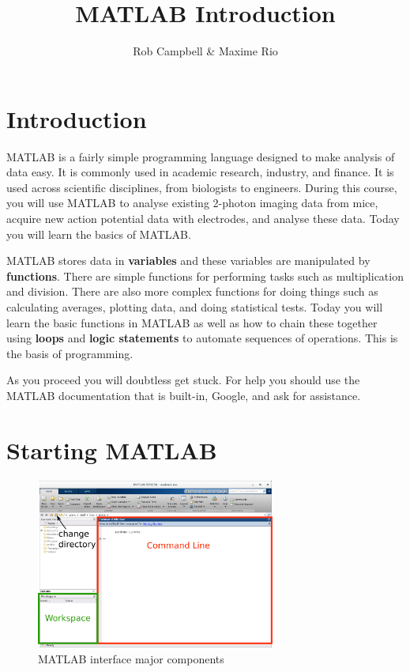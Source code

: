 \documentclass{article}
\title{MATLAB Introduction}
\author{Rob Campbell \& Maxime Rio}
\date{}
\begin{document}
\maketitle


\section*{Introduction}

MATLAB is a fairly simple programming language designed to make analysis of data easy.
It is commonly used in academic research, industry, and finance.
It is used across scientific disciplines, from biologists to engineers.
During this course, you will use MATLAB to analyse existing 2-photon imaging data from mice, 
acquire new action potential data with electrodes, and analyse these data.
Today you will learn the basics of MATLAB.

MATLAB stores data in \textbf{variables} and these variables are manipulated by \textbf{functions}.
There are simple functions for performing tasks such as multiplication and division.
There are also more complex functions for doing things such as calculating averages, plotting data, and doing statistical tests.
Today you will learn the basic functions in  MATLAB as well as how to chain these together using \textbf{loops} and \textbf{logic statements} to automate sequences of operations.
This is the basis of programming.

As you proceed you will doubtless get stuck. For help you should use the MATLAB documentation that is built-in, Google, and ask for assistance.


\section{Starting MATLAB}

\begin{figure}
  \centering
  \includegraphics[width=0.7\textwidth]{interface.pdf}
  \caption{MATLAB interface major components}\label{fig:interface}
\end{figure}
\end{document}
